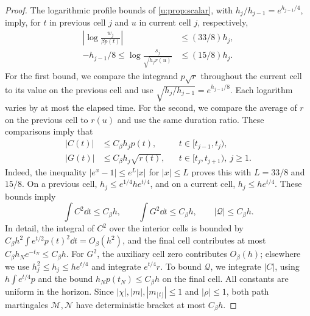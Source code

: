 \begin{proof}
The logarithmic profile bounds of \cref{u:prop:scalar}, with $h_j/h_{j-1}=e^{h_{j-1}/4}$, imply, for $t$ in previous cell $j$ and $u$ in current cell $j$, respectively,
\begin{equation}\label{u:eq:adjacent-profile-ratios}
\begin{aligned}
 \left|\log\frac{w_j}{\beta p(t)}\right|&\le(33/8)h_j,\\
 -h_{j-1}/8\le\log\frac{s_j}{\sqrt{h_jr(u)}}&\le(15/8)h_j.
\end{aligned}
\end{equation}
For the first bound, we compare the integrand $p\sqrt r$ throughout the current cell to its value on the previous cell and use $\sqrt{h_j/h_{j-1}}=e^{h_{j-1}/8}$. Each logarithm varies by at most the elapsed time. For the second, we compare the average of $r$ on the previous cell to $r(u)$ and use the same duration ratio. These comparisons imply that
\begin{equation}\label{u:eq:residual-coefficient-bounds}
\begin{aligned}
 |C(t)|&\le C_\beta h_jp(t),&&t\in[t_{j-1},t_j),\\
 |G(t)|&\le C_\beta h_j\sqrt{r(t)},&&t\in[t_j,t_{j+1}),\ j\ge1.
\end{aligned}
\end{equation}
Indeed, the inequality $|e^x-1|\le e^L|x|$ for $|x|\le L$ proves this with $L=33/8$ and $15/8$. On a previous cell, $h_j\le e^{1/4}he^{t/4}$, and on a current cell, $h_j\le he^{t/4}$. These bounds imply
\begin{equation}\label{u:eq:residual-bracket-bounds}
 \int C^2\dd t\le C_\beta h,\qquad
 \int G^2\dd t\le C_\beta h,\qquad
 |\mathcal Q|\le C_\beta h.
\end{equation}
In detail, the integral of $C^2$ over the interior cells is bounded by $C_\beta h^2\int e^{t/2}p(t)^2\dd t=O_\beta(h^2)$, and the final cell contributes at most $C_\beta h_Ne^{-t_N}\le C_\beta h$. For $G^2$, the auxiliary cell zero contributes $O_\beta(h)$; elsewhere we use $h_j^2\le h_j\le he^{t/4}$ and integrate $e^{t/4}r$. To bound $\mathcal Q$, we integrate $|C|$, using $h\int e^{t/4}p$ and the bound $h_Np(t_N)\le C_\beta h$ on the final cell. All constants are uniform in the horizon. Since $|\chi|,|m|,|m_{\lfloor t\rfloor}|\le1$ and $|\rho|\le1$, both path martingales $\mathcal M,\mathcal N$ have deterministic bracket at most $C_\beta h$.


\end{proof}

